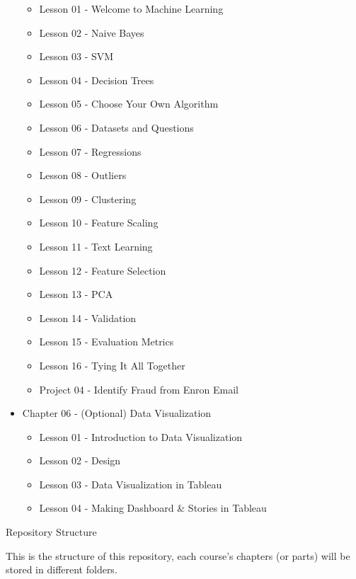 \documentclass[]{book}
\providecommand{\tightlist}{%
  \setlength{\itemsep}{0pt}\setlength{\parskip}{0pt}}
\begin{document}
\begin{itemize}
  \begin{itemize}
  \tightlist
  \item
    Lesson 01 - Welcome to Machine Learning
  \item
    Lesson 02 - Naive Bayes
  \item
    Lesson 03 - SVM
  \item
    Lesson 04 - Decision Trees
  \item
    Lesson 05 - Choose Your Own Algorithm
  \item
    Lesson 06 - Datasets and Questions
  \item
    Lesson 07 - Regressions
  \item
    Lesson 08 - Outliers
  \item
    Lesson 09 - Clustering
  \item
    Lesson 10 - Feature Scaling
  \item
    Lesson 11 - Text Learning
  \item
    Lesson 12 - Feature Selection
  \item
    Lesson 13 - PCA
  \item
    Lesson 14 - Validation
  \item
    Lesson 15 - Evaluation Metrics
  \item
    Lesson 16 - Tying It All Together
  \item
    Project 04 - Identify Fraud from Enron Email
  \end{itemize}
\item
  Chapter 06 - (Optional) Data Visualization

  \begin{itemize}
  \tightlist
  \item
    Lesson 01 - Introduction to Data Visualization
  \item
    Lesson 02 - Design
  \item
    Lesson 03 - Data Visualization in Tableau
  \item
    Lesson 04 - Making Dashboard \& Stories in Tableau
  \end{itemize}
\end{itemize}

Repository Structure

This is the structure of this repository, each course's chapters (or
parts) will be stored in different folders.
\end{document}
